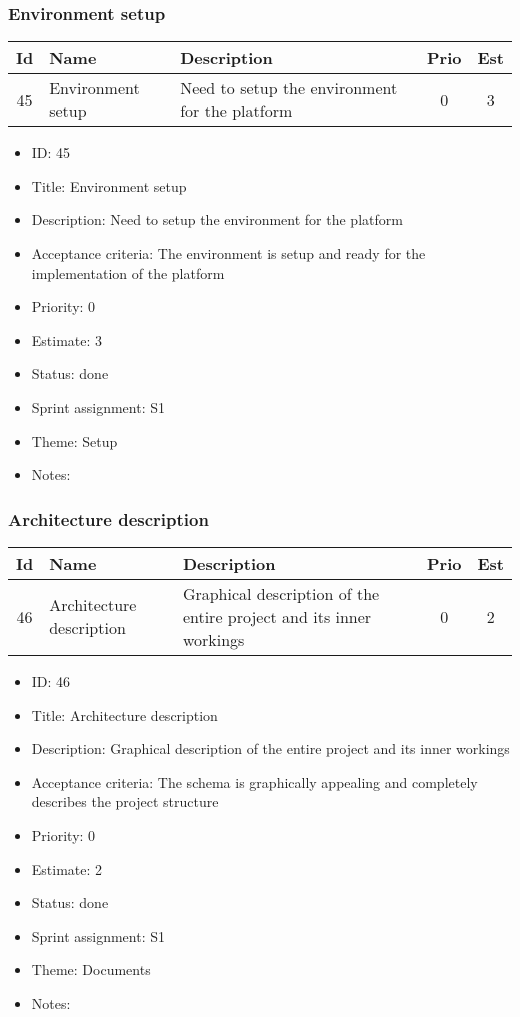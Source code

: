 \newpage
\subsubsection{Environment setup}
\begin{tabular}{|c|m{1.5cm}|m{4cm}|c|c|}
	\hline
	\textbf{Id}&\textbf{Name}&\textbf{Description}&\textbf{Prio}&\textbf{Est}\\
	\hline
	45 & Environment setup & 
	Need to setup the environment for the platform &
	0 & 3 \\
	\hline
\end{tabular}
\begin{itemize}
	\item ID: 45
	\item Title: Environment setup
	\item Description: Need to setup the environment for the platform
	\item Acceptance criteria: The environment is setup and ready for the implementation of the platform
	\item Priority: 0
	\item Estimate: 3
	\item Status: done
	\item Sprint assignment: S1
	\item Theme: Setup
	\item Notes:
\end{itemize}

\newpage
\subsubsection{Architecture description}
\begin{tabular}{|c|m{1.5cm}|m{4cm}|c|c|}
	\hline
	\textbf{Id}&\textbf{Name}&\textbf{Description}&\textbf{Prio}&\textbf{Est}\\
	\hline
	46 & Architecture description & 
	Graphical description of the entire project and its inner workings &
	0 & 2 \\
	\hline
\end{tabular}
\begin{itemize}
	\item ID: 46
	\item Title: Architecture description
	\item Description: Graphical description of the entire project and its inner workings
	\item Acceptance criteria: The schema is graphically appealing and completely describes the project structure
	\item Priority: 0
	\item Estimate: 2
	\item Status: done
	\item Sprint assignment: S1
	\item Theme: Documents
	\item Notes:
\end{itemize}

